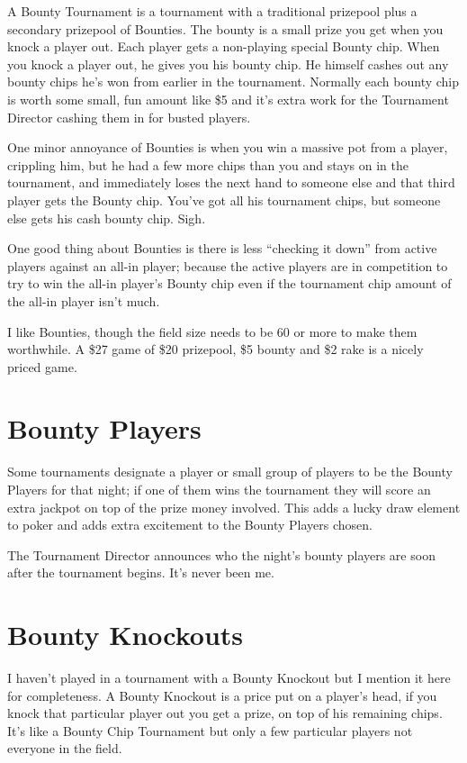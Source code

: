 A Bounty Tournament is a tournament with a traditional prizepool
plus a secondary prizepool of Bounties. The bounty
is a small prize you get when you knock a player out.
Each player gets a non-playing special Bounty chip.
When you knock a player out, he gives you his bounty chip.
He himself cashes out any bounty chips he's won from
earlier in the tournament. Normally each bounty chip is worth
some small, fun amount like \$5 and it's extra work for the
Tournament Director cashing them in for busted players.

One minor annoyance of Bounties is when you win a massive pot
from a player, crippling him, but he had a few more chips than
you and stays on in the tournament, and immediately loses the
next hand to someone else and that third player gets the
Bounty chip. You've got all his tournament chips, but someone
else gets his cash bounty chip. Sigh.

One good thing about Bounties is there is less ``checking it down''
from active players against an all-in player; because the active
players are in competition to try to win the all-in player's
Bounty chip even if the tournament chip amount of the all-in player
isn't much.

I like Bounties, though the field size needs to be 60 or more to
make them worthwhile. A \$27 game of \$20 prizepool, \$5 bounty
and \$2 rake is a nicely priced game.

\section{Bounty Players}

Some tournaments designate a player or small group of players
to be the Bounty Players for that night; if one of them wins
the tournament they will score an extra jackpot on top of
the prize money involved. This adds a lucky draw element to
poker and adds extra excitement to the Bounty Players chosen.

The Tournament Director announces who the night's bounty players
are soon after the tournament begins. It's never been me.

\section{Bounty Knockouts}

I haven't played in a tournament with a Bounty Knockout but I
mention it here for completeness. A Bounty Knockout is a price
put on a player's head, if you knock that particular player out
you get a prize, on top of his remaining chips. It's like a
Bounty Chip Tournament but only a few particular players not
everyone in the field.

